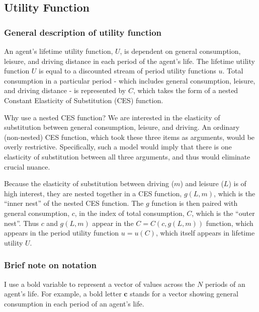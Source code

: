 \documentclass[letter, 12pt, epsf,leqno]{article}
\begin{document}
\subsection{Utility Function}

\subsubsection{General description of utility function}

An agent's lifetime utility function, $U$, is dependent on general consumption, leisure, and driving distance in each period of the agent's life.  The lifetime utility function $U$ is equal to a discounted stream of period utility functions $u$.  Total consumption in a particular period - which includes general consumption, leisure, and driving distance - is represented by $C$, which takes the form of a nested Constant Elasticity of Substitution (CES) function.

Why use a nested CES function?  We are interested in the elasticity of substitution between general consumption, leisure, and driving.  An ordinary (non-nested) CES function, which took these three items as arguments, would be overly restrictive.  Specifically, such a model would imply that there is one elasticity of substitution between all three arguments, and thus would eliminate crucial nuance.  

Because the elasticity of substitution between driving ($m$) and leisure ($L$) is of high interest, they are nested together in a CES function, $g(L, m)$, which is the ``inner nest'' of the nested CES function.  The $g$ function is then paired with general consumption, $c$, in the index of total consumption, $C$, which is the ``outer nest''.  Thus $c$ and $g(L, m)$ appear in the $C = C(c, g(L, m))$ function, which appears in the period utility function $u=u(C)$, which itself appears in lifetime utility $U$.

\subsubsection{Brief note on notation}

I use a bold variable to represent a vector of values across the $N$ periods of an agent's life.  For example, a bold letter $\boldsymbol{c}$ stands for a vector showing general consumption in each period of an agent's life.
\end{document}
